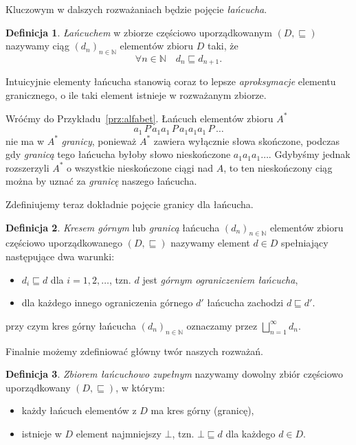 \documentclass[11pt,a4paper]{article}
\theoremstyle{definition}
\newtheorem{definicja}{Definicja}[section]
\theoremstyle{plain}
\newcommand{\bt}{\bot}                            %
\begin{document}
Kluczowym w dalszych rozważaniach będzie pojęcie \emph{łańcucha}.

\begin{definicja}
	\emph{Łańcuchem} w zbiorze częściowo uporządkowanym $(D, \sqsubseteq)$ nazywamy ciąg $(d_n)_{n \in \mathbb{N}}$ elementów zbioru $D$ taki, że
	\[
	\forall n \in \mathbb{N} \quad d_n \sqsubseteq d_{n+1}.
	\]
\end{definicja}

Intuicyjnie elementy łańcucha stanowią coraz to lepsze \emph{aproksymacje} elementu granicznego, o ile taki element istnieje w rozważanym zbiorze. 

Wróćmy do Przykładu~\ref{prz:alfabet}. Łańcuch elementów zbioru $A^*$
\[
	a_1 \, P \, a_1a_1 \, P \, a_1a_1a_1 \, P \, \ldots
\]
nie ma w $A^*$ \emph{granicy}, ponieważ $A^*$ zawiera wyłącznie słowa skończone, podczas gdy \emph{granicą} tego łańcucha byłoby słowo nieskończone $a_1a_1a_1\ldots$. Gdybyśmy jednak rozszerzyli $A^*$ o wszystkie nieskończone ciągi nad $A$, to ten nieskończony ciąg można by uznać za \emph{granicę} naszego łańcucha.

Zdefiniujemy teraz dokładnie pojęcie granicy dla łańcucha.

\begin{definicja}
	\emph{Kresem górnym} lub \emph{granicą} łańcucha $(d_n)_{n \in \mathbb{N}}$  elementów zbioru częściowo uporządkowanego $(D, \sqsubseteq)$ nazywamy element $d \in D$ spełniający następujące dwa warunki:
	\begin{itemize}
		\item [(1)] $d_i \sqsubseteq d$ dla $i = 1,2,\ldots$, tzn. $d$ jest \emph{górnym ograniczeniem łańcucha},
		\item [(2)] dla każdego innego ograniczenia górnego $d'$ łańcucha zachodzi $d \sqsubseteq d'$.
	\end{itemize}
	przy czym kres górny łańcucha $(d_n)_{n \in \mathbb{N}}$ oznaczamy przez $\bigsqcup_{n=1}^{\infty} d_n.$
\end{definicja}

Finalnie możemy zdefiniować główny twór naszych rozważań. 

\begin{definicja}
	\emph{Zbiorem łańcuchowo zupełnym} nazywamy dowolny zbiór częściowo uporządkowany $(D, \sqsubseteq)$, w którym:
	\begin{itemize}
		\item [(1)] każdy łańcuch elementów z $D$ ma kres górny (granicę),
		\item [(2)] istnieje w $D$ element najmniejszy $\bt$, tzn. $\bt \sqsubseteq d$ dla każdego $d \in D$.
	\end{itemize}
\end{definicja}
\end{document}
